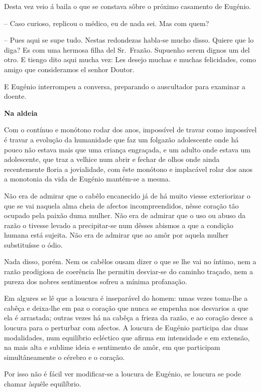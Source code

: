 \documentclass[9pt]{article}
\begin{document}
Desta vez veio á baila o que se constava sôbre o próximo casamento de
Eugé\-nio.

-- Caso curioso, replicou o médico, eu de nada sei. Mas com quem?

-- Pues aqui se supe tudo. Nestas redondezas habla-se mucho disso. Quiere que lo diga? Es com uma hermosa fi\-lha del Sr.\ Frazão. Supuenho serem
dignos um del otro. E tiengo dito aqui mucha vez: Les desejo muchas e muchas felicidades, como amigo que consideramos el senhor Doutor.

E Eugé\-nio interrompeu a conversa, preparando o auscultador para examinar
a doente.

\begin{center}\bf\large Na aldeia\end{center}

Com o contínuo e monótono rodar dos anos, impossível de travar como
impossível é travar a evolu\-ção da humanidade que faz um folgazão adolescente onde há pouco não estava mais que uma crian\-ça engraçada, e um adulto onde estava um adolescente, que traz a ve\-lhice num abrir e fechar de o\-lhos
onde ainda recentemente floria a jovialidade, com êste monótono e implacável rolar dos anos a monotonia da vida de Eugé\-nio mantém-se a mesma.

Não era de admirar que o cabêlo encanecido já de há muito viesse exteriorizar o que se vai naquela alma cheia de afectos incompreendidos, nêsse cora\-ção tão ocupado pela paixão duma mu\-lher. Não era de admirar que o
uso ou abuso da razão o tivesse levado a precipitar-se num dêsses abismos
a que a condi\-ção humana está sujeita. Não era de admirar que ao amôr por
aquela mu\-lher substituísse o ódio.

Nada disso, porém. Nem os cabêlos ousam dizer o que se lhe vai no íntimo, nem a razão prodigiosa de coerência lhe permitiu desvi\-\mbox{ar-se} do caminho traçado, nem a pureza dos nobres sentimentos sofreu a mínima profana\-ção.

Em algures se lê que a loucura é inseparável do homem: umas vezes
toma-\-lhe a cabêça e deixa-\-lhe em paz o cora\-ção que nunca se empenha nos
desvarios a que ela é arrastada; outras vezes há na cabêça a frieza da razão, e ao cora\-ção desce a loucura para o perturbar com afectos. A loucura
de Eugé\-nio participa das duas modalidades, num equilíbrio ecléctico que
afirma em intensidade e em extensão, na mais alta e sublime ideia e sentimento
de amôr, em que participam simultâneamente o cérebro e o cora\-ção.

Por isso não é fácil ver modifi\-car-se a loucura de Eugé\-nio, se loucura
se pode chamar àquêle equilíbrio.
\end{document}
